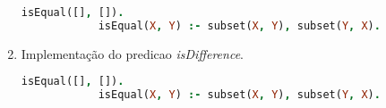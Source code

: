 \documentclass{article}
\begin{document}
\begin{enumerate}
          \begin{lstlisting}[language=Prolog]
            isEqual([], []).
            isEqual(X, Y) :- subset(X, Y), subset(Y, X).
        \end{lstlisting}

    \item

          Implementação do predicao \textit{isDifference}.

          \begin{lstlisting}[language=Prolog]
            isEqual([], []).
            isEqual(X, Y) :- subset(X, Y), subset(Y, X).
        \end{lstlisting}

\end{enumerate}
\end{document}
